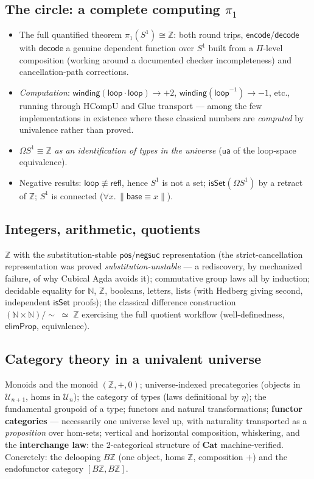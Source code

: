 \documentclass[11pt]{article}
\newcommand{\Z}{\mathbb{Z}}
\newcommand{\N}{\mathbb{N}}
\newcommand{\U}{\mathcal{U}}
\newcommand{\op}[1]{\ensuremath{\mathsf{#1}}}
\begin{document}
\subsection{The circle: a complete computing $\pi_1$}
\begin{itemize}[leftmargin=1.5em]
\item The full quantified theorem $\pi_1(S^1)\cong\Z$: both round trips,
$\op{encode}$/$\op{decode}$ with $\op{decode}$ a genuine dependent
function over $S^1$ built from a $\Pi$-level composition (working around
a documented checker incompleteness) and cancellation-path corrections.
\item \emph{Computation}: $\op{winding}(\op{loop}\cdot\op{loop})
\longrightarrow +2$, $\op{winding}(\op{loop}^{-1})\longrightarrow -1$,
etc., running through HCompU and Glue transport --- among the few
implementations in existence where these classical numbers are
\emph{computed} by univalence rather than proved.
\item $\Omega S^1\equiv\Z$ \emph{as an identification of types in the
universe} ($\op{ua}$ of the loop-space equivalence).
\item Negative results: $\op{loop}\not\equiv\op{refl}$, hence $S^1$ is
not a set; $\op{isSet}(\Omega S^1)$ by a retract of $\Z$; $S^1$ is
connected ($\forall x.\,\lVert \op{base}\equiv x\rVert$).
\end{itemize}

\subsection{Integers, arithmetic, quotients}
$\Z$ with the substitution-stable $\op{pos}/\op{negsuc}$ representation
(the strict-cancellation representation was proved
\emph{substitution-unstable} --- a rediscovery, by mechanized failure, of
why Cubical Agda avoids it); commutative group laws all by induction;
decidable equality for $\N$, $\Z$, booleans, letters, lists (with
Hedberg giving second, independent $\op{isSet}$ proofs); the classical
difference construction $(\N\times\N)/{\sim}\;\simeq\;\Z$ exercising the
full quotient workflow (well-definedness, $\op{elimProp}$, equivalence).

\subsection{Category theory in a univalent universe}
Monoids and the monoid $(\Z,+,0)$; universe-indexed precategories (objects
in $\U_{n+1}$, homs in $\U_n$); the category of types (laws definitional
by $\eta$); the fundamental groupoid of a type; functors and natural
transformations; \textbf{functor categories} --- necessarily one universe
level up, with naturality transported as a \emph{proposition} over
hom-sets; vertical and horizontal composition, whiskering, and the
\textbf{interchange law}: the 2-categorical structure of $\mathbf{Cat}$
machine-verified.  Concretely: the delooping $B\Z$ (one object, homs
$\Z$, composition $+$) and the endofunctor category $[B\Z,B\Z]$.
\end{document}
